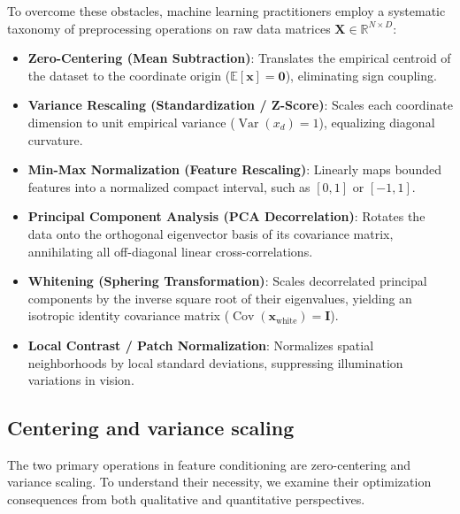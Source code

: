 To overcome these obstacles, machine learning practitioners employ a systematic taxonomy of preprocessing operations on raw data matrices $\mathbf{X} \in \mathbb{R}^{N \times D}$:
\begin{itemize}[noitemsep,topsep=2pt,parsep=0pt,partopsep=0pt]
  \item \textbf{Zero-Centering (Mean Subtraction)}: Translates the empirical centroid of the dataset to the coordinate origin ($\mathbb{E}[\mathbf{x}] = \mathbf{0}$), eliminating sign coupling.
  \item \textbf{Variance Rescaling (Standardization / Z-Score)}: Scales each coordinate dimension to unit empirical variance ($\operatorname{Var}(x_d) = 1$), equalizing diagonal curvature.
  \item \textbf{Min-Max Normalization (Feature Rescaling)}: Linearly maps bounded features into a normalized compact interval, such as $[0, 1]$ or $[-1, 1]$.
  \item \textbf{Principal Component Analysis (PCA Decorrelation)}: Rotates the data onto the orthogonal eigenvector basis of its covariance matrix, annihilating all off-diagonal linear cross-correlations.
  \item \textbf{Whitening (Sphering Transformation)}: Scales decorrelated principal components by the inverse square root of their eigenvalues, yielding an isotropic identity covariance matrix ($\operatorname{Cov}(\mathbf{x}_{\text{white}}) = \mathbf{I}$).
  \item \textbf{Local Contrast / Patch Normalization}: Normalizes spatial neighborhoods by local standard deviations, suppressing illumination variations in vision.
\end{itemize}

\subsection{Centering and variance scaling}
\label{sec:zero_centering_scaling}

The two primary operations in feature conditioning are zero-centering and variance scaling. To understand their necessity, we examine their optimization consequences from both qualitative and quantitative perspectives.

